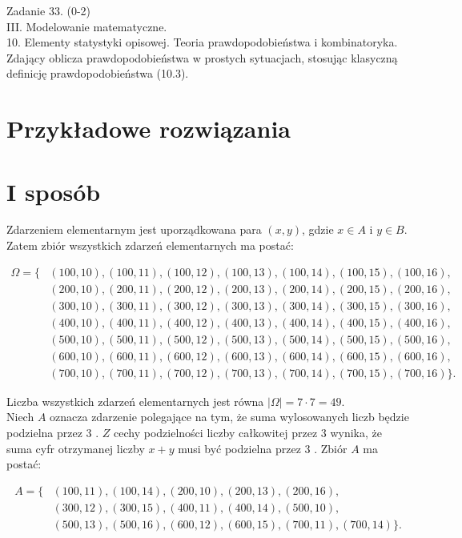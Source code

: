 \documentclass[10pt]{article}
\begin{document}
Zadanie 33. (0-2)\\
III. Modelowanie matematyczne.\\
10. Elementy statystyki opisowej. Teoria prawdopodobieństwa i kombinatoryka. Zdający oblicza prawdopodobieństwa w prostych sytuacjach, stosując klasyczną definicję prawdopodobieństwa (10.3).

\section*{Przykładowe rozwiązania}
\section*{I sposób}
Zdarzeniem elementarnym jest uporządkowana para $(x, y)$, gdzie $x \in A$ i $y \in B$. Zatem zbiór wszystkich zdarzeń elementarnych ma postać:

$$
\begin{aligned}
\Omega=\{ & (100,10),(100,11),(100,12),(100,13),(100,14),(100,15),(100,16), \\
& (200,10),(200,11),(200,12),(200,13),(200,14),(200,15),(200,16), \\
& (300,10),(300,11),(300,12),(300,13),(300,14),(300,15),(300,16), \\
& (400,10),(400,11),(400,12),(400,13),(400,14),(400,15),(400,16), \\
& (500,10),(500,11),(500,12),(500,13),(500,14),(500,15),(500,16), \\
& (600,10),(600,11),(600,12),(600,13),(600,14),(600,15),(600,16), \\
& (700,10),(700,11),(700,12),(700,13),(700,14),(700,15),(700,16)\} .
\end{aligned}
$$

Liczba wszystkich zdarzeń elementarnych jest równa $|\Omega|=7 \cdot 7=49$.\\
Niech $A$ oznacza zdarzenie polegające na tym, że suma wylosowanych liczb będzie podzielna przez 3 . $Z$ cechy podzielności liczby całkowitej przez 3 wynika, że suma cyfr otrzymanej liczby $x+y$ musi być podzielna przez 3 . Zbiór $A$ ma postać:

$$
\begin{aligned}
A=\{ & (100,11),(100,14),(200,10),(200,13),(200,16), \\
& (300,12),(300,15),(400,11),(400,14),(500,10), \\
& (500,13),(500,16),(600,12),(600,15),(700,11),(700,14)\} .
\end{aligned}
$$
\end{document}
